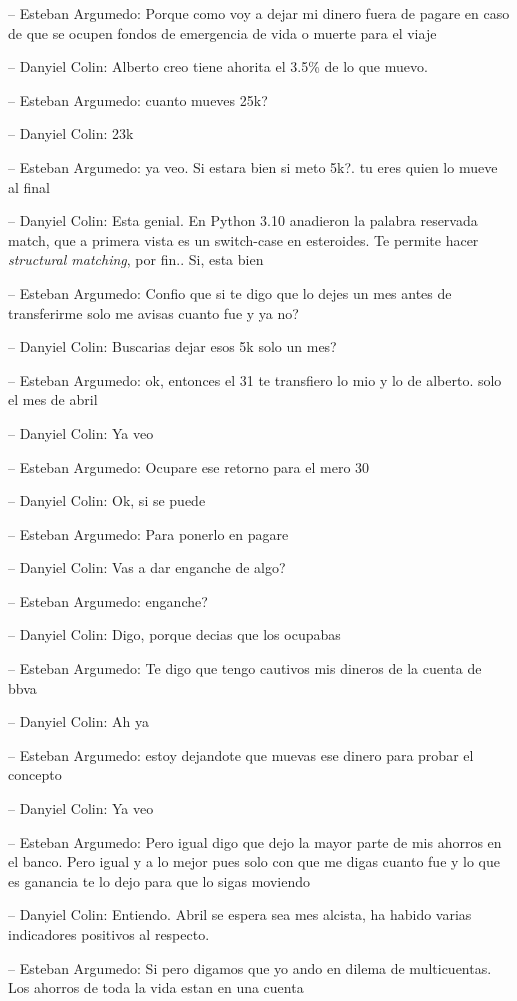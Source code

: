 -- Esteban Argumedo: Porque como voy a dejar mi dinero fuera de pagare
en caso de que se ocupen fondos de emergencia de vida o muerte para el
viaje

-- Danyiel Colin: Alberto creo tiene ahorita el 3.5\% de lo que muevo.

-- Esteban Argumedo: cuanto mueves 25k?

-- Danyiel Colin: 23k

-- Esteban Argumedo: ya veo. Si estara bien si meto 5k?. tu eres quien
lo mueve al final

-- Danyiel Colin: Esta genial. En Python 3.10 anadieron la palabra
reservada match, que a primera vista es un switch-case en esteroides. Te
permite hacer \emph{structural matching}, por fin.. Si, esta bien

-- Esteban Argumedo: Confio que si te digo que lo dejes un mes antes de
transferirme solo me avisas cuanto fue y ya no?

-- Danyiel Colin: Buscarias dejar esos 5k solo un mes?

-- Esteban Argumedo: ok, entonces el 31 te transfiero lo mio y lo de
alberto. solo el mes de abril

-- Danyiel Colin: Ya veo

-- Esteban Argumedo: Ocupare ese retorno para el mero 30

-- Danyiel Colin: Ok, si se puede

-- Esteban Argumedo: Para ponerlo en pagare

-- Danyiel Colin: Vas a dar enganche de algo?

-- Esteban Argumedo: enganche?

-- Danyiel Colin: Digo, porque decias que los ocupabas

-- Esteban Argumedo: Te digo que tengo cautivos mis dineros de la cuenta
de bbva

-- Danyiel Colin: Ah ya

-- Esteban Argumedo: estoy dejandote que muevas ese dinero para probar
el concepto

-- Danyiel Colin: Ya veo

-- Esteban Argumedo: Pero igual digo que dejo la mayor parte de mis
ahorros en el banco. Pero igual y a lo mejor pues solo con que me digas
cuanto fue y lo que es ganancia te lo dejo para que lo sigas moviendo

-- Danyiel Colin: Entiendo. Abril se espera sea mes alcista, ha habido
varias indicadores positivos al respecto.

-- Esteban Argumedo: Si pero digamos que yo ando en dilema de
multicuentas. Los ahorros de toda la vida estan en una cuenta

